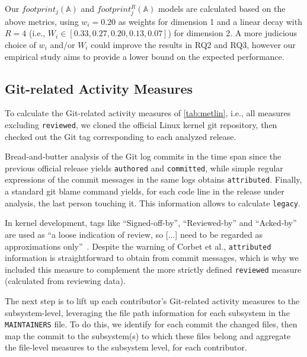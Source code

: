 Our $footprint_j(\mathbb{A})$ and $footprint_j^R(\mathbb{A})$ models are calculated based on the above metrics, using $w_i=0.20$ as weights for dimension 1 and a linear decay with $R=4$ (i.e., $W_i \in [0.33,0.27,0.20,0.13,0.07]$) for dimension 2. A more judicious choice of $w_i$ and/or $W_i$ could improve the results in RQ2 and RQ3, however our empirical study aims to provide a lower bound on the expected performance.


\subsection{Git-related Activity Measures}
\label{sec:git-relat-activ}

To calculate the Git-related activity measures of \autoref{tab:metlin}, i.e., all measures excluding \texttt{reviewed}, we cloned the official Linux kernel git repository, then checked out the Git tag corresponding to each analyzed release.

Bread-and-butter analysis of the Git log commits in the time span since the previous official release yields \texttt{authored} and \texttt{committed}, while simple regular expressions of the commit messages in the same logs obtains \texttt{attributed}. Finally, a standard git blame command yields, for each code line in the release under analysis, the last person touching it. This information allows to calculate \texttt{legacy}.

In kernel development, tags like ``Signed-off-by'', ``Reviewed-by'' and ``Acked-by'' are used as ``a loose indication of review, so [...] need to be regarded as approximations only''~\cite{corbet17}. Despite the warning of Corbet et al., \texttt{attributed} information is straightforward to obtain from commit messages, which is why we included this measure to complement the more strictly defined \texttt{reviewed} measure (calculated from reviewing data).

The next step is to lift up each contributor's Git-related activity measures to the subsystem-level, leveraging the file path information for each subsystem in the \texttt{MAINTAINERS} file. To do this, we identify for each commit the changed files, then map the commit to the subsystem(s) to which these files belong and aggregate the file-level measures to the subsystem level, for each contributor.%

